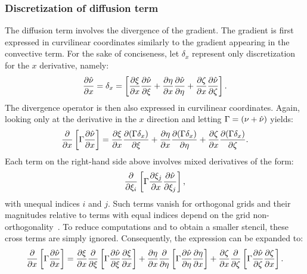 \subsubsection{Discretization of diffusion term}
%
The diffusion term involves the divergence of the gradient. The gradient is first expressed in curvilinear coordinates similarly to the gradient appearing in the convective term. For the sake of conciseness, let $\delta_x$ represent only discretization for the $x$ derivative, namely:
\begin{equation*}
    \pdiff{\sa}{x} = \delta_x = 
    \left[ 
        \pdiff{\xi}{x}\pdiff{\sa}{\xi} + \pdiff{\eta}{x}\pdiff{\sa}{\eta} +
            \pdiff{\zeta}{x}\pdiff{\sa}{\zeta}
    \right].
\end{equation*}
The divergence operator is then also expressed in curvilinear coordinates. Again, looking only at the derivative in the $x$ direction and letting $\Gamma = (\nu + \sa)$ yields:
\begin{equation*}
    \pdiff{}{x}\left[\Gamma\pdiff{\sa}{x}\right]
    =
    \pdiff{\xi}{x}\pdiff{(\Gamma\delta_x)}{\xi}
    + \pdiff{\eta}{x}\pdiff{(\Gamma\delta_x)}{\eta}
    + \pdiff{\zeta}{x}\pdiff{(\Gamma\delta_x)}{\zeta}.
\end{equation*}
Each term on the right-hand side above involves mixed derivatives of the form:
\begin{equation}
    \pdiff{}{\xi_i}\left[
        \Gamma\pdiff{\xi_j}{x}\pdiff{\sa}{\xi_j}
    \right],
\end{equation}
with unequal indices $i$ and $j$. Such terms vanish for orthogonal grids and their magnitudes relative to terms with equal indices depend on the grid non-orthogonality~\cite{ferziger2012computational}. To reduce computations and to obtain a smaller stencil, these cross terms are simply ignored. Consequently, the expression can be expanded to:
\begin{equation*}
    \pdiff{}{x}\left[\Gamma\pdiff{\sa}{x}\right] = \pdiff{\xi}{x}\pdiff{}{\xi}\left[
        \Gamma\pdiff{\sa}{\xi}\pdiff{\xi}{x}
    \right]
    + 
    \pdiff{\eta}{x}\pdiff{}{\eta}\left[
        \Gamma\pdiff{\sa}{\eta}\pdiff{\eta}{x}
    \right]
    + 
    \pdiff{\zeta}{x}\pdiff{}{\zeta}\left[
        \Gamma\pdiff{\sa}{\zeta}\pdiff{\zeta}{x}
    \right].    
\end{equation*}

